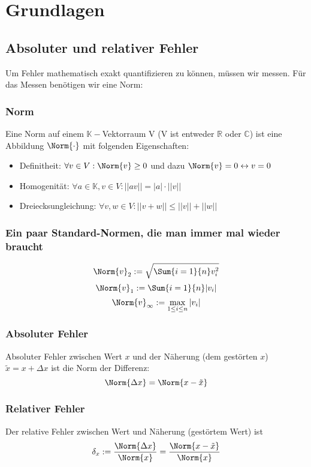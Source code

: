 \section{Grundlagen}
	\subsection{Absoluter und relativer Fehler}
		Um Fehler mathematisch exakt quantifizieren zu können, müssen wir messen. Für das
		Messen benötigen wir eine Norm:
		
		\subsubsection{Norm}
			Eine Norm auf einem $ \mathbb{K}-$Vektorraum V (V ist entweder $ \mathbb{R} $ oder $ \mathbb{C} $) ist eine Abbildung $ \Norm{\cdot} $ mit folgenden Eigenschaften:
			\begin{itemize}
				\item Definitheit: $\forall v \in V: \Norm{v} \geq 0 $ und dazu $ \Norm{v} = 0 \leftrightarrow v = 0 $
				\item Homogenität: $\forall a \in \mathbb{K}, v \in V: ||av|| = |a| \cdot ||v|| $
				\item Dreiecksungleichung: $ \forall v,w \in V: ||v+w|| \leq ||v|| + ||w||$
			\end{itemize}
			
		\subsubsection{Ein paar Standard-Normen, die man immer mal wieder braucht}
			$$ \Norm{v}_2 := \sqrt{\Sum{i=1}{n}v_i^2} $$
			$$ \Norm{v}_1 := \Sum{i=1}{n}|v_i| $$
			$$ \Norm{v}_\infty := \max\limits_{1 \leq i \leq n}|v_i| $$
		
		
		
		\subsubsection{Absoluter Fehler}
			Absoluter Fehler zwischen Wert $ x $ und der Näherung (dem gestörten $ x $) $ \tilde{x} = x + \Delta x $ ist die Norm der Differenz:
			$$ \Norm{\Delta x} = \Norm{x-\tilde{x}} $$
			
			
		\subsubsection{Relativer Fehler}
			Der relative Fehler zwischen Wert und Näherung (gestörtem Wert) ist
			$$ \delta_x := \frac{\Norm{\Delta x}}{\Norm{x}} = \frac{\Norm{x-\tilde{x}}}{\Norm{x}}$$
		\pagebreak
		
